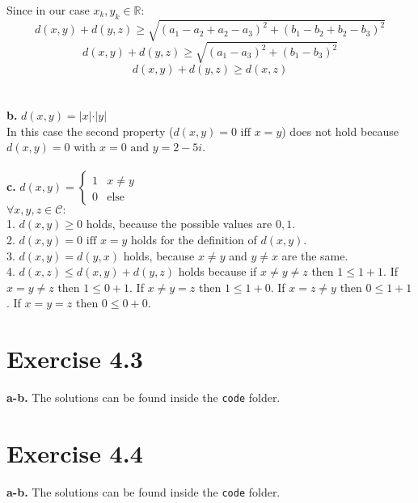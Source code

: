 \documentclass[12pt]{article}
\begin{document}
	Since in our case $x_k,y_k \in \mathbb{R}$:
	$$d(x,y) + d(y,z) \geq \sqrt{(a_1 - a_2 + a_2 - a_3)^2 + (b_1 - b_2 + b_2 - b_3)^2}  $$
	$$d(x,y) + d(y,z) \geq \sqrt{(a_1 - a_3)^2 + (b_1 - b_3)^2}  $$
	$$d(x,y) + d(y,z)  \geq d(x,z)$$\\\\
	\textbf{b.} $d(x,y) = \vert x \vert \cdot \vert y \vert$\\
	In this case the second property ($d(x, y) = 0 \text{ iff } x = y$) does not hold because $d(x,y) = 0 \text{ with } x = 0 \text{ and } y = 2 - 5i$.\\\\
	\textbf{c.} $d(x,y) = \begin{cases} 1 & x \neq y\\ 0 & \mbox{else} \end{cases}$\\
	$\forall x, y, z \in \mathcal{C}:$\\
	1. $d(x,y) \geq 0$ holds, because the possible values are $0,1$.\\
	2. $d(x, y) = 0 \text{ iff } x = y$ holds for the definition of $d(x,y)$.\\
	3. $d(x, y) = d(y,x)$ holds, because $x \neq y$ and $y \neq x$ are the same.\\
	4. $d(x, z) \leq d(x, y) + d(y, z)$ holds because if $ x \neq y \neq z$ then $1 \leq 1 + 1$. If $x = y \neq z$ then $1 \leq 0 + 1$. If $x \neq y = z$ then $1 \leq 1 + 0$. If $x = z \neq y$ then $0 \leq 1 + 1$. If $x = y = z$ then $0 \leq 0 + 0$.
	
	\section*{Exercise 4.3}
	\textbf{a-b.} The solutions can be found inside the \texttt{code} folder.
	\section*{Exercise 4.4}
	\textbf{a-b.} The solutions can be found inside the \texttt{code} folder.
\end{document}
